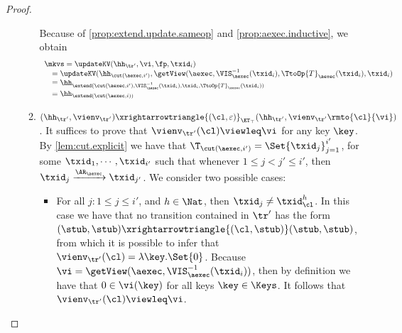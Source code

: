 \begin{proof}
\begin{itemize}
\begin{enumerate}
Because of \cref{prop:extend.update.sameop} and \cref{prop:aexec.inductive},
we obtain 
\[
\begin{array}{l}
\mkvs = \updateKV(\hh_{\tr'}, \vi, \fp, \txid_{i}) \\
\quad = \updateKV(\hh_{\cut(\aexec, i')}, \getView(\aexec, \VIS^{-1}_{\aexec}(\txid_{i}), \TtoOp{T}_{\aexec}(\txid_{i}), \txid_{i}) \\
\quad = \hh_{\extend(\cut(\aexec, i'), \VIS^{-1}_{\aexec}(\txid_{i}), \txid_{i}, \TtoOp{T}_{\aexec}(\txid_{i})) } \\
\quad = \hh_{\extend(\cut(\aexec, i))}
\end{array}
\]

\item $(\hh_{\tr'}, \vienv_{\tr'}) \xrightarrowtriangle{(\cl, \varepsilon)}_{\ET_{\top}} (\hh_{\tr'}, \vienv_{\tr'}\rmto{\cl}{\vi})$. 
It suffices to prove that $\vienv_{\tr'}(\cl) \viewleq \vi$ for any key $\key$.
By \cref{lem:cut.explicit} we have that $\T_{\cut(\aexec, i')} = \Set{\txid_{j}}_{j=1}^{i'}$, for 
some $\txid_{1},\cdots, \txid_{i'}$ such that whenever $1 \leq j < j' \leq i'$, then 
$\txid_{j} \xrightarrow{\AR_{\aexec}} \txid_{j'}$. We consider two possible cases: 

\begin{itemize}
\item For all $j : 1 \leq j \leq i'$, and $h \in \Nat$, then $\txid_{j} \neq \txid_{\cl}^{h}$.
In this case we have that no transition contained in $\tr'$ has the form 
$(\stub, \stub) \xrightarrowtriangle{(\cl, \stub)} (\stub, \stub)$, from which it is possible to infer 
that  $\vienv_{\tr'}(\cl) = \lambda \key. \Set{0}$. Because $\vi = \getView(\aexec, \VIS^{-1}_{\aexec}(\txid_{i}))$, 
then by definition we have that $0 \in \vi(\key)$ for all keys $\key \in \Keys$. It follows that 
$\vienv_{\tr'}(\cl) \viewleq \vi$. 


\end{itemize}
\end{enumerate}
\end{itemize}
\end{proof}
